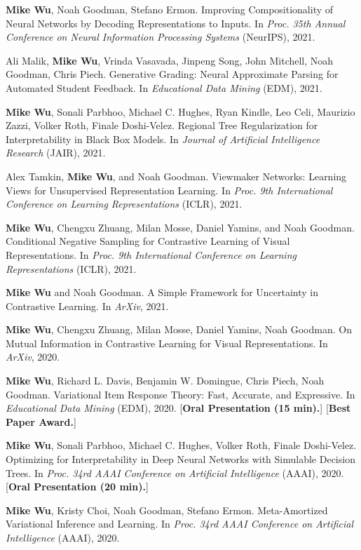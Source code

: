 \documentclass[margin, 10pt]{res} %
\begin{document}
\begin{resume}
\textbf{Mike Wu}, Noah Goodman, Stefano Ermon. Improving Compositionality of Neural Networks by Decoding Representations to Inputs. In \textit{Proc. 35th Annual Conference on Neural Information Processing Systems} (NeurIPS), 2021.

Ali Malik, \textbf{Mike Wu}, Vrinda Vasavada, Jinpeng Song, John Mitchell, Noah Goodman, Chris Piech. Generative Grading: Neural Approximate Parsing for Automated Student Feedback. In \textit{Educational Data Mining} (EDM), 2021. 

\textbf{Mike Wu}, Sonali Parbhoo, Michael C. Hughes, Ryan Kindle, Leo Celi, Maurizio Zazzi, Volker Roth, Finale Doshi-Velez. Regional Tree Regularization for Interpretability in Black Box Models. In \textit{Journal of Artificial Intelligence Research} (JAIR), 2021.

Alex Tamkin, \textbf{Mike Wu}, and Noah Goodman. Viewmaker Networks: Learning Views for Unsupervised Representation Learning. In \textit{Proc. 9th International Conference on Learning Representations} (ICLR), 2021.

\textbf{Mike Wu}, Chengxu Zhuang, Milan Mosse, Daniel Yamins, and Noah Goodman. Conditional Negative Sampling for Contrastive Learning of Visual Representations. In \textit{Proc. 9th International Conference on Learning Representations} (ICLR), 2021.

\textbf{Mike Wu} and Noah Goodman. A Simple Framework for Uncertainty in Contrastive Learning. In \textit{ArXiv}, 2021. 

\textbf{Mike Wu}, Chengxu Zhuang, Milan Mosse, Daniel Yamins, Noah Goodman. On Mutual Information in Contrastive Learning for Visual Representations. In \textit{ArXiv}, 2020.

\textbf{Mike Wu}, Richard L. Davis, Benjamin W. Domingue, Chris Piech, Noah Goodman. Variational Item Response Theory: Fast, Accurate, and Expressive. In \textit{Educational Data Mining} (EDM), 2020. [\textbf{Oral Presentation (15 min).}] [\textbf{Best Paper Award.}]

\textbf{Mike Wu}, Sonali Parbhoo, Michael C. Hughes, Volker Roth, Finale Doshi-Velez. Optimizing for Interpretability in Deep Neural Networks with Simulable Decision Trees. In \textit{Proc. 34rd AAAI Conference on Artificial Intelligence} (AAAI), 2020. [\textbf{Oral Presentation (20 min).}]

\textbf{Mike Wu}, Kristy Choi, Noah Goodman, Stefano Ermon. Meta-Amortized Variational Inference and Learning. In \textit{Proc. 34rd AAAI Conference on Artificial Intelligence} (AAAI), 2020.


\end{resume}
\end{document}
